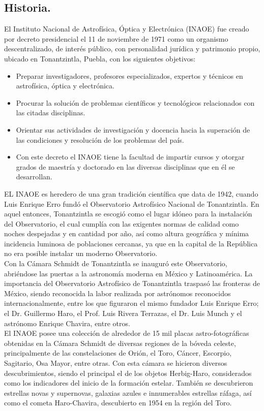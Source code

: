 \subsection{Historia.}
El Instituto Nacional de Astrofísica, Óptica y Electrónica (INAOE) fue creado por decreto presidencial el 11 de noviembre de 1971 como un organismo descentralizado, de interés público, con personalidad jurídica y patrimonio propio, ubicado en Tonantzintla, Puebla, con los siguientes objetivos:
\begin{itemize}
	\item Preparar investigadores, profesores especializados, expertos y técnicos en astrofísica, óptica y electrónica.
	\item Procurar la solución de problemas científicos y tecnológicos relacionados con las citadas disciplinas.
	\item Orientar sus actividades de investigación y docencia hacia la superación de las condiciones y resolución de los problemas del país.
	\item Con este decreto el INAOE tiene la facultad de impartir cursos y otorgar grados de maestría y doctorado en las diversas disciplinas que en él se desarrollan.
\end{itemize}

EL INAOE es heredero de una gran tradición científica que data de 1942, cuando Luis Enrique Erro fundó el Observatorio Astrofísico Nacional de Tonantzintla. En aquel entonces, Tonantzintla se escogió como el lugar idóneo para la instalación del Observatorio, el cual cumplía con las exigentes normas de calidad como noches despejadas y en cantidad por año, así como altura geográfica y mínima incidencia luminosa de poblaciones cercanas, ya que en la capital de la República no era posible instalar un moderno Observatorio.
\\

Con la Cámara Schmidt de Tonantzintla se inauguró este Observatorio, abriéndose las puertas a la astronomía moderna en México y Latinoamérica. La importancia del Observatorio Astrofísico de Tonantzintla traspasó las fronteras de México, siendo reconocida la labor realizada por astrónomos reconocidos internacionalmente, entre los que figuraron el mismo fundador Luis Enrique Erro; el Dr. Guillermo Haro, el Prof. Luis Rivera Terrazas, el Dr. Luis Munch y el astrónomo Enrique Chavira, entre otros.
\\
 
El INAOE posee una colección de alrededor de 15 mil placas astro-fotográficas obtenidas en la Cámara Schmidt de diversas regiones de la bóveda celeste, principalmente de las constelaciones de Orión, el Toro, Cáncer, Escorpio, Sagitario, Osa Mayor, entre otras. Con esta cámara se hicieron diversos descubrimientos, siendo el principal el de los objetos Herbig-Haro, considerados como los indicadores del inicio de la formación estelar. También se descubrieron estrellas novas y supernovas, galaxias azules e innumerables estrellas ráfaga, así como el cometa Haro-Chavira, descubierto en 1954 en la región del Toro.
\\
  
